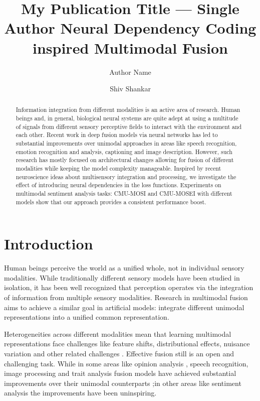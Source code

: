 \documentclass[letterpaper]{article} %
\title{My Publication Title --- Single Author}
\author {
    Author Name \\
}
\title{ Neural Dependency Coding inspired Multimodal Fusion}
\author {
        
        Shiv Shankar
}
\begin{document}
\maketitle


\begin{abstract}
Information integration from different modalities is an active area of research. Human beings and, in general, biological neural systems are quite adept at using a multitude of signals from different sensory perceptive fields to interact with the environment and each other.
Recent work in deep fusion models via neural networks has led to substantial improvements over unimodal approaches in areas like speech recognition, emotion recognition and analysis, captioning and image description. However, such research has mostly focused on architectural changes allowing for fusion of different modalities while keeping the model complexity manageable.
Inspired by recent neuroscience ideas about multisensory integration and processing, we investigate the effect of introducing neural dependencies in the loss functions. Experiments on multimodal sentiment analysis tasks:  CMU-MOSI and CMU-MOSEI with different models show that our approach provides a consistent performance boost.
\end{abstract}

\section{Introduction}


Human beings perceive the world as a unified whole, not in individual sensory modalities. While traditionally different sensory models have been studied in isolation, it has been well recognized that perception operates via the integration of information from multiple sensory modalities. Research in multimodal fusion aims to achieve a similar goal in artificial models: integrate different unimodal representations into a unified common representation.



Heterogeneities across different modalities mean that learning multimodal representations face challenges like feature shifts, distributional effects, nuisance variation and other related challenges \citep{baltruvsaitis2018multimodal}. Effective fusion still is an open and challenging task. While in some areas like opinion analysis \citep{garcia2019multimodal, soleymani2017survey}, speech recognition, image processing \citep{xu2015multi, xu2013survey} and trait analysis \citep{park2014computational} fusion models have achieved substantial improvements over their unimodal counterparts ;in other areas like sentiment analysis \cite{rahman2020integrating} the improvements have been uninspiring.
\end{document}
